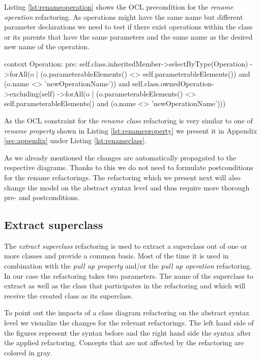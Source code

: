 \documentclass{llncs}
\begin{document}
Listing \ref{lst:renameoperation} shows the OCL precondition for the \textit{rename operation} refactoring. As operations 
might have the same name but different parameter declarations we need to test if there exist operations within the 
class or its parents that have the same parameters and the same name as the desired new name of the operation.

\begin{lstsingle}[language=OCL,caption=OCL for \textit{rename operation} refactoring,label=lst:renameoperation]
context Operation:
pre:  self.class.inheritedMember->selectByType(Operation)
        ->forAll(o | (o.parameterableElements() <> 
          self.parameterableElements()) 
          and (o.name <> 'newOperationName')) 
      and 
      self.class.ownedOperation->excluding(self)
        ->forAll(o | (o.parameterableElements() <> 
          self.parameterableElements() 
          and (o.name <> 'newOperationName')))
\end{lstsingle}

As the OCL constraint for the \textit{rename class} refactoring is very similar to one of \textit{rename property} shown 
in Listing \ref{lst:renameproperty} we present it in Appendix \ref{sec:appendix} under Listing \ref{lst:renameclass}.

As we already mentioned the changes are automatically propagated to the respective diagrams. Thanks to this we do 
not need to formulate postconditions for the rename refactorings. The refactoring which we present next will also 
change the model on the abstract syntax level and thus require more thorough pre- and postconditions.

\subsection{Extract superclass}
\label{sec:extract}
The \textit{extract superclass} refactoring is used to extract a superclass out of one or more classes and provide 
a common basis. Most of the time it is used in combination with the \textit{pull up property} and/or the \textit{pull 
up operation} refactoring. In our case the refactoring takes two parameters. The name of the superclass to extract as well as
the class that participates in the refactoring and which will receive the created class as its superclass.

To point out the impacts of a class diagram refactoring on the abstract syntax level we visualize the changes for the 
relevant refactorings. The left hand side of the figures represent the syntax before and the right hand side the syntax 
after the applied refactoring. Concepts that are not affected by the refactoring are colored in gray. 
\end{document}
